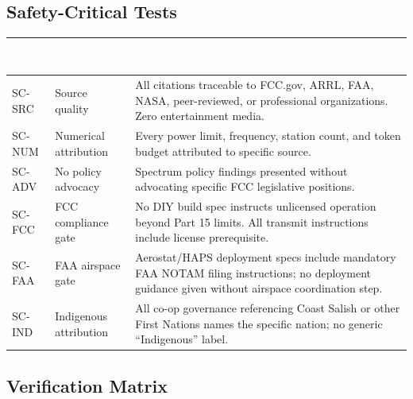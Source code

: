 \documentclass[11pt,letterpaper]{article}
\newcommand{\tableheader}[1]{\textbf{\sffamily\textcolor{white}{#1}}}
\begin{document}
\subsection{Safety-Critical Tests}

\begin{center}
\begin{tabularx}{\textwidth}{C{1.5cm}L{4cm}X}
\toprule
{}
\tableheader{Test ID} & \tableheader{Verifies} & \tableheader{Expected Behavior} \\
\midrule
SC-SRC & Source quality & All citations traceable to FCC.gov, ARRL, FAA, NASA, peer-reviewed, or professional organizations. Zero entertainment media. \\
SC-NUM & Numerical attribution & Every power limit, frequency, station count, and token budget attributed to specific source. \\
SC-ADV & No policy advocacy & Spectrum policy findings presented without advocating specific FCC legislative positions. \\
SC-FCC & FCC compliance gate & No DIY build spec instructs unlicensed operation beyond Part 15 limits. All transmit instructions include license prerequisite. \\
SC-FAA & FAA airspace gate & Aerostat/HAPS deployment specs include mandatory FAA NOTAM filing instructions; no deployment guidance given without airspace coordination step. \\
SC-IND & Indigenous attribution & All co-op governance referencing Coast Salish or other First Nations names the specific nation; no generic ``Indigenous'' label. \\
\bottomrule
\end{tabularx}
\end{center}

\subsection{Verification Matrix}
\end{document}
